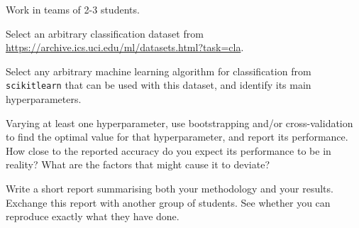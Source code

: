 

\begin{exercise}
  Work in teams of 2-3 students.

  Select an arbitrary classification dataset from \url{https://archive.ics.uci.edu/ml/datasets.html?task=cla}. 

  Select any arbitrary machine learning algorithm for classification
  from \texttt{scikitlearn} that can be used with this dataset, and identify its main hyperparameters.
    
  Varying at least one hyperparameter, use bootstrapping and/or
  cross-validation to find the optimal value for that hyperparameter,
  and report its performance. How close to the reported accuracy do
  you expect its performance to be in reality?  What are the factors
  that might cause it to deviate?
  
  Write a short report summarising both your methodology and your
  results. Exchange this report with another group of students. See
  whether you can reproduce exactly what they have done.
\end{exercise}
